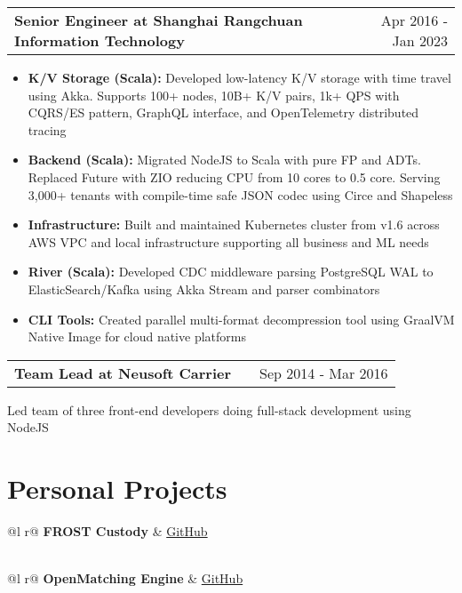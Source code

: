 \documentclass[a4paper,12pt]{article}
\makeatletter
\newenvironment{jobshort}[2]
    {
    \begin{tabularx}{\linewidth}{@{}l X r@{}}
    \textbf{#1} & \hfill &  #2 \\[3.75pt]
    \end{tabularx}
    }
    {
    }
\newenvironment{joblong}[2]
    {
    \begin{tabularx}{\linewidth}{@{}l X r@{}}
    \textbf{#1} & \hfill &  #2 \\[3.75pt]
    \end{tabularx}
    \begin{minipage}[t]{\linewidth}
    \begin{itemize}[nosep,after=\strut, leftmargin=1em, itemsep=3pt,label=--]
    }
    {
    \end{itemize}
    \end{minipage}    
    }
\makeatother
\begin{document}
\begin{joblong}{Senior Engineer at Shanghai Rangchuan Information Technology}{Apr 2016 - Jan 2023}
\item \textbf{K/V Storage (Scala):} Developed low-latency K/V storage with time travel using Akka. Supports 100+ nodes, 10B+ K/V pairs, 1k+ QPS with CQRS/ES pattern, GraphQL interface, and OpenTelemetry distributed tracing
\item \textbf{Backend (Scala):} Migrated NodeJS to Scala with pure FP and ADTs. Replaced Future with ZIO reducing CPU from 10 cores to 0.5 core. Serving 3,000+ tenants with compile-time safe JSON codec using Circe and Shapeless
\item \textbf{Infrastructure:} Built and maintained Kubernetes cluster from v1.6 across AWS VPC and local infrastructure supporting all business and ML needs
\item \textbf{River (Scala):} Developed CDC middleware parsing PostgreSQL WAL to ElasticSearch/Kafka using Akka Stream and parser combinators
\item \textbf{CLI Tools:} Created parallel multi-format decompression tool using GraalVM Native Image for cloud native platforms
\end{joblong}

\begin{jobshort}{Team Lead at Neusoft Carrier}{Sep 2014 - Mar 2016}
Led team of three front-end developers doing full-stack development using NodeJS
\end{jobshort}

\section{Personal Projects}

\begin{tabularx}{\linewidth}{ @{}l r@{} }
\textbf{FROST Custody} & \hfill \href{https://github.com/openmatching/frost-custody}{GitHub} \\[3.75pt]
  \\
\end{tabularx}

\begin{tabularx}{\linewidth}{ @{}l r@{} }
\textbf{OpenMatching Engine} & \hfill \href{https://github.com/openmatching/openmatching}{GitHub} \\[3.75pt]
  \\
\end{tabularx}
  
\end{document}
